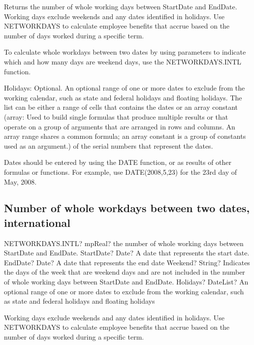 \vspace{0.3cm}
Returns the number of whole working days between StartDate and EndDate. Working days exclude weekends and any dates identified in holidays. Use NETWORKDAYS to calculate employee benefits that accrue based on the number of days worked during a specific term.

To calculate whole workdays between two dates by using parameters to indicate which and how many days are weekend days, use the NETWORKDAYS.INTL function.

Holidays:  Optional. An optional range of one or more dates to exclude from the working calendar, such as state and federal holidays and floating holidays. The list can be either a range of cells that contains the dates or an array constant (array: Used to build single formulas that produce multiple results or that operate on a group of arguments that are arranged in rows and columns. An array range shares a common formula; an array constant is a group of constants used as an argument.) of the serial numbers that represent the dates.

Dates should be entered by using the DATE function, or as results of other formulas or functions. For example, use DATE(2008,5,23) for the 23rd day of May, 2008.



\subsection{Number of whole workdays between two dates, international}

\begin{mpFunctionsExtract}
	\mpWorksheetFunctionThreeNotImplemented
	{NETWORKDAYS.INTL? mpReal? the number of whole working days between StartDate and EndDate.}
	{StartDate? Date? A date that represents the start date.}
	{EndDate? Date? A date that represents the end date}
	{Weekend? String? Indicates the days of the week that are weekend days and are not included in the number of whole working days between StartDate and EndDate.}
	{Holidays? DateList?  An optional range of one or more dates to exclude from the working calendar, such as state and federal holidays and floating holidays}
\end{mpFunctionsExtract}

\vspace{0.3cm}
Working days exclude weekends and any dates identified in holidays. Use NETWORKDAYS to calculate employee benefits that accrue based on the number of days worked during a specific term.

